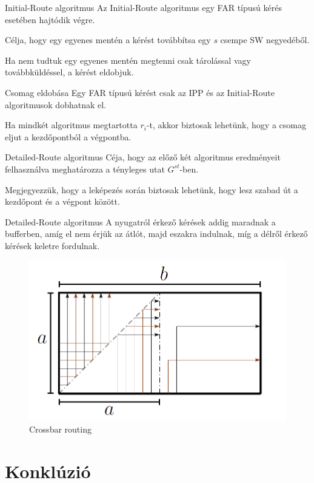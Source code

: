 \documentclass[10pt]{beamer}
\begin{document}
\begin{frame}{Initial-Route algoritmus}
	Az Initial-Route algoritmus egy FAR típusú kérés esetében hajtódik végre.
	
	Célja, hogy egy egyenes mentén a kérést továbbítsa egy $s$ csempe SW negyedéből.
	
	Ha nem tudtuk egy egyenes mentén megtenni csak tárolással vagy továbbküldéssel, a kérést eldobjuk.
\end{frame}

\begin{frame}{Csomag eldobása}
	Egy FAR típusú kérést csak az IPP és az Initial-Route algoritmusok dobhatnak el.
	
	Ha mindkét algoritmus megtartotta $r_i$-t, akkor biztosak lehetünk, hogy a csomag eljut a kezdőpontból a végpontba.
\end{frame}

\begin{frame}{Detailed-Route algoritmus}
	Céja, hogy az előző két algoritmus eredményeit felhasználva meghatározza a tényleges utat $G^{st}$-ben.
	
	Megjegyezzük, hogy a leképezés során biztosak lehetünk, hogy lesz szabad út a kezdőpont és a végpont között.
\end{frame}

\begin{frame}{Detailed-Route algoritmus}
	A nyugatról érkező kérések addig maradnak a bufferben, amíg el nem érjük az átlót, majd eszakra indulnak, míg a délről érkező kérések keletre fordulnak.
	\begin{figure}
		\centering \includegraphics[width=0.65\columnwidth]{Image/routing1}
		\caption{\label{fig:routing}Crossbar routing}
	\end{figure}
\end{frame}

\section{Konklúzió}
\end{document}
